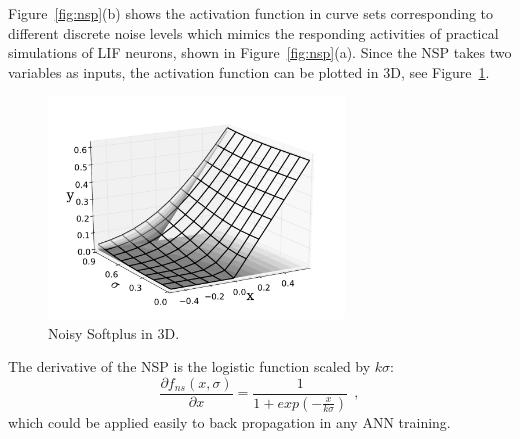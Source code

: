 	Figure~\ref{fig:nsp}(b) shows the activation function in curve sets corresponding to different discrete noise levels which mimics the responding activities of practical simulations of LIF neurons, shown in Figure~\ref{fig:nsp}(a).
	Since the NSP takes two variables as inputs, the activation function can be plotted in 3D, see Figure~\ref{Fig:NSP3D}.

	\begin{figure}[bt]
		\centering
		\includegraphics[width=0.7\textwidth]{pics_iconip/5.pdf}
		\DIFdelbeginFL %
\DIFdelendFL \DIFaddbeginFL \caption[NSP in 3D.]{\DIFaddendFL Noisy Softplus in 3D.}
		\label{Fig:NSP3D}
	\end{figure}

	The derivative of the NSP is the logistic function scaled by $k\sigma$:
	\begin{equation}
	\frac{\partial f_{ns}(x,\sigma)}{\partial x} = \frac{1}{1+exp(-\frac{x}{k\sigma})}~~,
	\label{equ:logist}
	\end{equation}	
	which could be applied easily to back propagation in any ANN training.	

	
